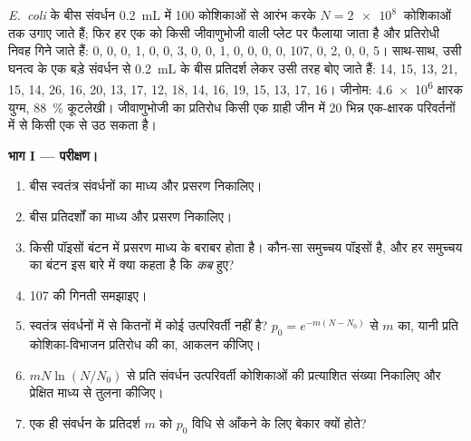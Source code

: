 \begin{problem}
\label{pb:b2:genome-diversification:1}
\emph{E.~coli} के बीस संवर्धन \qty{0.2}{mL} में \num{100}
कोशिकाओं से आरंभ करके $N = \qty{2e8}{}$ कोशिकाओं तक उगाए जाते हैं; फिर
हर एक को किसी जीवाणुभोजी वाली प्लेट पर फैलाया जाता है और प्रतिरोधी निवह
गिने जाते हैं: 0, 0, 0, 1, 0, 0, 3, 0, 0, 1, 0, 0, 0, 0, 107,
0, 2, 0, 0, 5। साथ-साथ, उसी घनत्व के एक बड़े संवर्धन से \qty{0.2}{mL}
के बीस प्रतिदर्श लेकर उसी तरह बोए जाते हैं:
14, 15, 13, 21, 15, 14, 26, 16, 20, 13, 17, 12, 18, 14, 16, 19, 15,
13, 17, 16। जीनोम: \qty{4.6e6}{} क्षारक युग्म, \qty{88}{\%} कूटलेखी।
जीवाणुभोजी का प्रतिरोध किसी एक ग्राही जीन में \num{20} भिन्न
एक-क्षारक परिवर्तनों में से किसी एक से उठ सकता है।

\medskip
\noindent\textbf{भाग I --- परीक्षण।}
\begin{enumerate}
  \item बीस स्वतंत्र संवर्धनों का माध्य और प्रसरण निकालिए।
  \item बीस प्रतिदर्शों का माध्य और प्रसरण निकालिए।
  \item किसी पॉइसों बंटन में प्रसरण माध्य के बराबर होता है। कौन-सा
        समुच्चय पॉइसों है, और हर समुच्चय का बंटन इस बारे में क्या कहता
        है कि  \emph{कब} हुए?
  \item 107 की गिनती समझाइए।
  \item स्वतंत्र संवर्धनों में से कितनों में कोई उत्परिवर्ती नहीं है?
        $p_0 = e^{-m(N - N_0)}$ से $m$ का, यानी प्रति कोशिका-विभाजन
        प्रतिरोध की  का, आकलन कीजिए।
  \item $mN\ln(N/N_0)$ से प्रति संवर्धन उत्परिवर्ती कोशिकाओं की
        प्रत्याशित संख्या निकालिए और प्रेक्षित माध्य से तुलना कीजिए।
  \item एक ही संवर्धन के प्रतिदर्श $m$ को $p_0$ विधि से आँकने के लिए
        बेकार क्यों होते?
\end{enumerate}


\end{problem}
